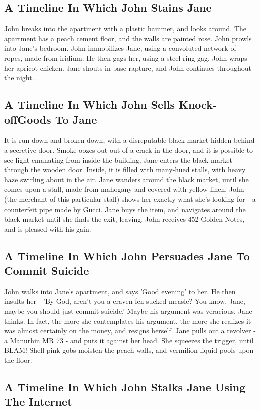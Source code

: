 \documentclass{article}
\begin{document}
\subsection{A Timeline In Which John Stains Jane}


John breaks into the apartment with a plastic hammer, and looks around.
The apartment has a peach cement floor, and the walls are painted rose.
John prowls into Jane's bedroom.
John immobilizes Jane, using a convoluted network of ropes, made from iridium.
He then gags her, using a steel ring{-}gag.
John wraps her apricot chicken.
Jane shouts in base rapture, and John continues throughout the night...
\subsection{A Timeline In Which John Sells Knock{-}offGoods To Jane}


It is run{-}down and broken{-}down, with a disreputable black market hidden behind a secretive door.
Smoke oozes out out of a crack in the door, and it is possible to see light emanating from inside the building.
Jane enters the black market through the wooden door.
Inside, it is filled with many{-}hued stalls, with heavy haze swirling about in the air.
Jane wanders around the black market, until she comes upon a stall, made from mahogany and covered with yellow linen.
John (the merchant of this particular stall) shows her exactly what she's looking for {-} a counterfeit pipe made by Gucci.
Jane buys the item, and navigates around the black market until she finds the exit, leaving.
John receives 452 Golden Notes, and is pleased with his gain.
\subsection{A Timeline In Which John Persuades Jane To Commit Suicide}


John walks into Jane's apartment, and says 'Good evening' to her.
He then insults her {-} 'By God, aren't you a craven fen{-}sucked measle?
You know, Jane, maybe you should just commit suicide.'
Maybe his argument was veracious, Jane thinks.
In fact, the more she contemplates his argument, the more she realizes it was almost certainly on the money, and resigns herself.
Jane pulls out a revolver {-} a Manurhin MR 73 {-} and puts it against her head.
She squeezes the trigger, until BLAM!
Shell{-}pink gobs moisten the peach walls, and vermilion liquid pools upon the floor.
\subsection{A Timeline In Which John Stalks Jane Using The Internet}
\end{document}
